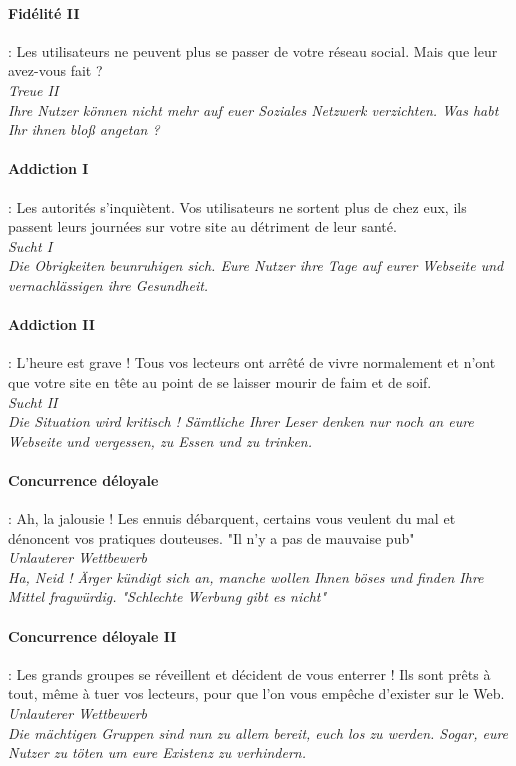 \documentclass[10pt,a4paper]{article}
\begin{document}
\paragraph{Fidélité II} : Les utilisateurs ne peuvent plus se passer de votre réseau social. Mais que leur avez-vous fait ?\\
\textit{Treue II}\\
\textit{Ihre Nutzer können nicht mehr auf euer Soziales Netzwerk verzichten. Was habt Ihr ihnen bloß angetan ?}


\paragraph{Addiction I} : Les autorités s'inquiètent. Vos utilisateurs ne sortent plus de chez eux, ils passent leurs journées sur votre site au détriment de leur santé.\\
\textit{Sucht I}\\
\textit{Die Obrigkeiten beunruhigen sich. Eure Nutzer ihre Tage auf eurer Webseite und vernachlässigen ihre Gesundheit.}


\paragraph{Addiction II} : L'heure est grave ! Tous vos lecteurs ont arrêté de vivre normalement et n'ont que votre site en tête au point de se laisser mourir de faim et de soif.\\
\textit{Sucht II}\\
\textit{Die Situation wird kritisch ! Sämtliche Ihrer Leser denken nur noch an eure Webseite und vergessen, zu Essen und zu trinken.}


\paragraph{Concurrence déloyale} : Ah, la jalousie ! Les ennuis débarquent, certains vous veulent du mal et dénoncent vos pratiques douteuses. "Il n'y a pas de mauvaise pub"\\
\textit{Unlauterer Wettbewerb}\\
\textit{Ha, Neid ! Ärger kündigt sich an, manche wollen Ihnen böses und finden Ihre Mittel fragwürdig. "Schlechte Werbung gibt es nicht"}


\paragraph{Concurrence déloyale II} : Les grands groupes se réveillent et décident de vous enterrer ! Ils sont prêts à tout, même à tuer vos lecteurs, pour que l'on vous empêche d'exister sur le Web.\\
\textit{Unlauterer Wettbewerb}\\
\textit{Die mächtigen Gruppen sind nun zu allem bereit, euch los zu werden. Sogar, eure Nutzer zu töten um eure Existenz zu verhindern.}
\end{document}
